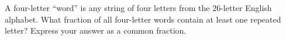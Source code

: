 A four-letter ``word'' is any string of four letters from the $26$-letter English alphabet. What fraction of all four-letter words contain at least one repeated letter? Express your answer as a common fraction.
